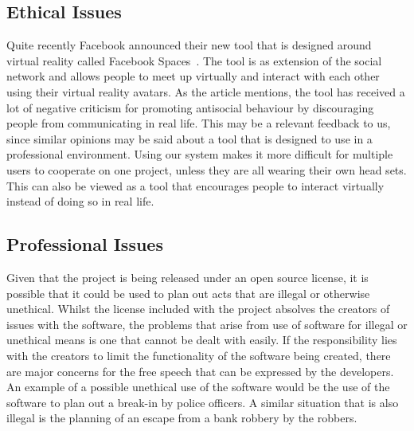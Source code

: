     \subsection{Ethical Issues}
        Quite recently Facebook announced their new tool that is designed around virtual reality called Facebook Spaces~\cite{facebook2017}. The tool is as extension of the social network and allows people to meet up virtually and interact with each other using their virtual reality avatars. As the article mentions, the tool has received a lot of negative criticism for promoting antisocial behaviour by discouraging people from communicating in real life. This may be a relevant feedback to us, since similar opinions may be said about a tool that is designed to use in a professional environment. Using our system makes it more difficult for multiple users to cooperate on one project, unless they are all wearing their own head sets. This can also be viewed as a tool that encourages people to interact virtually instead of doing so in real life.
        
    \subsection{Professional Issues}
        Given that the project is being released under an open source license, it is possible that it could be used to plan out acts that are illegal or otherwise unethical. Whilst the license included with the project absolves the creators of issues with the software, the problems that arise from use of software for illegal or unethical means is one that cannot be dealt with easily. If the responsibility lies with the creators to limit the functionality of the software being created, there are major concerns for the free speech that can be expressed by the developers. An example of a possible unethical use of the software would be the use of the software to plan out a break-in by police officers. A similar situation that is also illegal is the planning of an escape from a bank robbery by the robbers.